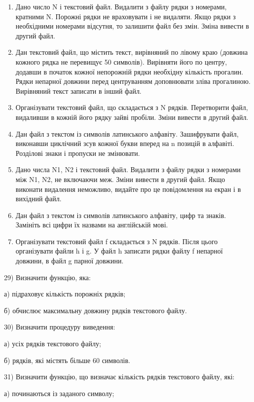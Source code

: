 \documentclass[]{article}
\begin{document}
\begin{enumerate}
\def\labelenumi{\arabic{enumi})}
\item
  Дано число N і текстовий файл. Видалити з файлу рядки з номерами,
  кратними N. Порожні рядки не враховувати і не видаляти. Якщо рядки з
  необхідними номерами відсутня, то залишити файл без змін. Зміна
  вивести в другий файл.
\item
  Дан текстовий файл, що містить текст, вирівняний по лівому краю
  (довжина кожного рядка не перевищує 50 символів). Вирівняти його по
  центру, додавши в початок кожної непорожній рядки необхідну кількість
  прогалин. Рядки непарної довжини перед центруванням доповнювати зліва
  прогалиною. Вирівняний текст записати в інший файл.
\item
  Організувати текстовий файл, що складається з N рядків. Перетворити
  файл, видаливши в кожній його рядку зайві пробіли. Зміни вивести в
  другий файл.
\item
  Дан файл з текстом із символів латинського алфавіту. Зашифрувати файл,
  виконавши циклічний зсув кожної букви вперед на n позицій в алфавіті.
  Розділові знаки і пропуски не змінювати.
\item
  Дано числа N1, N2 і текстовий файл. Видалити з файлу рядки з номерами
  між N1, N2, не включаючи меж. Зміни вивести в другий файл. Якщо
  виконати видалення неможливо, видайте про це повідомлення на екран і в
  вихідний файл.
\item
  Дан файл з текстом із символів латинського алфавіту, цифр та знаків.
  Замініть всі цифри їх назвами на англійській мові.
\item
  Організувати текстовий файл f складається з N рядків. Після цього
  організувати файли h і g. У файл h записати рядки файлу f непарної
  довжини, в файл g парної довжини.
\end{enumerate}

29) Визначити функцію, яка:

а) підраховує кількість порожніх рядків;

б) обчислює максимальну довжину рядків текстового файлу.

30) Визначити процедуру виведення:

а) усіх рядків текстового файлу;

б) рядків, які містять більше 60 символів.

31) Визначити функцію, що визначає кількість рядків текстового файлу,
які:

а) починаються із заданого символу;
\end{document}
